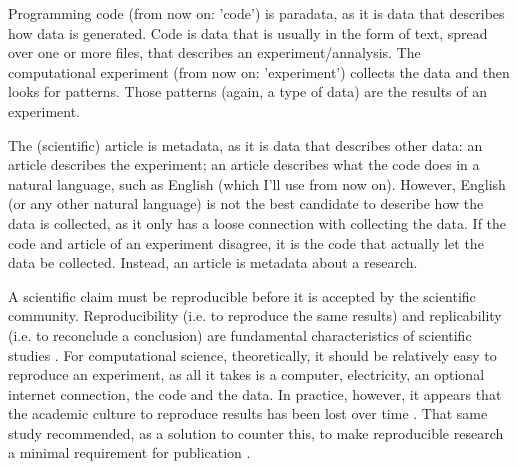 
Programming code (from now on: 'code') is paradata, 
as it is data that describes how data is generated.
Code is data that is usually in the form of text, 
spread over one or more files, that describes an experiment/annalysis.
The computational experiment (from now on: 'experiment') collects the data
and then looks for patterns.
Those patterns (again, a type of data) are the results of an experiment.

The (scientific) article is metadata, as it is data that describes other data:
an article describes the
experiment; an article describes what the code does in a natural 
language, such as English (which I'll use from now on).
However, English (or any other natural language) is not the best
candidate to describe how the data is collected,
as it only has a loose connection with collecting the data.
If the code and article of an experiment disagree,
it is the code that actually let the data be collected.  
Instead, an article is metadata about a research.


A scientific claim must be reproducible before it is accepted
by the scientific community.
Reproducibility (i.e. to reproduce the same results) 
and replicability (i.e. to reconclude a conclusion)
are fundamental characteristics of scientific studies \cite{patil2019visual}.
For computational science, theoretically, it should be relatively easy to 
reproduce an experiment, as all it takes is a computer, electricity,
an optional internet connection, the code and the data.
In practice, however, it appears that 
the academic culture to reproduce results 
has been lost over time \cite{peng2011reproducible}.
That same study recommended, as a solution to counter this, 
to make reproducible research a minimal requirement for 
publication \cite{peng2011reproducible}.


